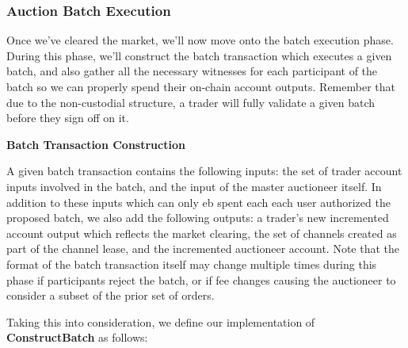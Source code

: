 \documentclass[10pt,a4paper]{article}
\theoremstyle{definition}
\begin{document}

\subsubsection{Auction Batch Execution}

Once we've cleared the market, we'll now move onto the batch execution phase.
During this phase, we'll construct the batch transaction which executes a given
batch, and also gather all the necessary witnesses for each participant of the
batch so we can properly spend their on-chain account outputs. Remember
that due to the non-custodial structure, a trader will fully validate a given
batch before they sign off on it.

\begin{center}
    \textbf{Batch Transaction Construction}
\end{center}

A given batch transaction contains the following inputs: the set of trader
account inputs involved in the batch, and the input of the master auctioneer
itself. In addition to these inputs which can only eb spent each each user
authorized the proposed batch, we also add the following outputs: a trader's
new incremented account output which reflects the market clearing, the set of
channels created as part of the channel lease, and the incremented auctioneer
account. Note that the format of the batch transaction itself may change
multiple times during this phase if participants reject the batch, or if fee
changes causing the auctioneer to consider a subset of the prior set of orders.

Taking this into consideration, we define our implementation of
\textbf{ConstructBatch} as follows:
\begin{pcvstack}[boxed,center, space=1em]
\end{pcvstack}
\end{document}
